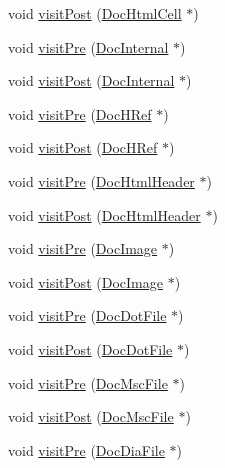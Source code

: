 \begin{DoxyCompactItemize}
\item 
void \hyperlink{class_man_doc_visitor_a107c1dc54180b0b461c4ccbd00c8614e}{visit\+Post} (\hyperlink{class_doc_html_cell}{Doc\+Html\+Cell} $\ast$)
\item 
void \hyperlink{class_man_doc_visitor_a35ae292757c3ae1f0bfcdb17e4e0e164}{visit\+Pre} (\hyperlink{class_doc_internal}{Doc\+Internal} $\ast$)
\item 
void \hyperlink{class_man_doc_visitor_ae0b3ff8b66fecedfd5862165e2dcc979}{visit\+Post} (\hyperlink{class_doc_internal}{Doc\+Internal} $\ast$)
\item 
void \hyperlink{class_man_doc_visitor_a07b590a805aabdd2e39146e952d6e68b}{visit\+Pre} (\hyperlink{class_doc_h_ref}{Doc\+H\+Ref} $\ast$)
\item 
void \hyperlink{class_man_doc_visitor_a203d00affbef71e9e3101d6c359a16d2}{visit\+Post} (\hyperlink{class_doc_h_ref}{Doc\+H\+Ref} $\ast$)
\item 
void \hyperlink{class_man_doc_visitor_aa841735a274000e156580446e3b588ce}{visit\+Pre} (\hyperlink{class_doc_html_header}{Doc\+Html\+Header} $\ast$)
\item 
void \hyperlink{class_man_doc_visitor_a601b7601f5875a3891d9b790dccb13ad}{visit\+Post} (\hyperlink{class_doc_html_header}{Doc\+Html\+Header} $\ast$)
\item 
void \hyperlink{class_man_doc_visitor_a1c1dff13ff841b3ddb4e1a710c2bdd9b}{visit\+Pre} (\hyperlink{class_doc_image}{Doc\+Image} $\ast$)
\item 
void \hyperlink{class_man_doc_visitor_a92700edd2e421eabf98bc10c5c847e75}{visit\+Post} (\hyperlink{class_doc_image}{Doc\+Image} $\ast$)
\item 
void \hyperlink{class_man_doc_visitor_a870d0d242da1508dd14adfe208691416}{visit\+Pre} (\hyperlink{class_doc_dot_file}{Doc\+Dot\+File} $\ast$)
\item 
void \hyperlink{class_man_doc_visitor_ab8fcaa39eb29a77e6847aeed1a344bf0}{visit\+Post} (\hyperlink{class_doc_dot_file}{Doc\+Dot\+File} $\ast$)
\item 
void \hyperlink{class_man_doc_visitor_a2a38feecfa32eaaf6b19d5de0f206791}{visit\+Pre} (\hyperlink{class_doc_msc_file}{Doc\+Msc\+File} $\ast$)
\item 
void \hyperlink{class_man_doc_visitor_ab9bd5efd00073e6c6b851bbf3c99f250}{visit\+Post} (\hyperlink{class_doc_msc_file}{Doc\+Msc\+File} $\ast$)
\item 
void \hyperlink{class_man_doc_visitor_ae4c3a324594f57a883844bcfd648d027}{visit\+Pre} (\hyperlink{class_doc_dia_file}{Doc\+Dia\+File} $\ast$)

\end{DoxyCompactItemize}
